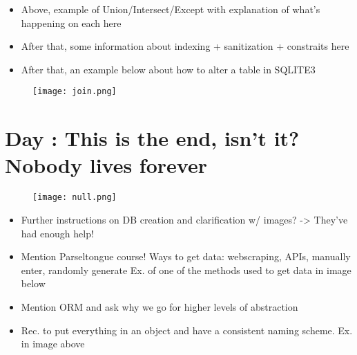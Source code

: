 \documentclass{42-en}
\begin{document}
	\begin{itemize}\itemsep1pt 
		\item Above, example of Union/Intersect/Except with explanation of what's happening on each here 
		\item After that, some information about indexing + sanitization + constraits here 
		\item After that, an example below about how to alter a table in SQLITE3
	\end{itemize}

            \begin{figure}[H]
                \begin{center}
                    \texttt{[image: join.png]}
                \end{center}
            \end{figure}

\nextexercice


\chapter{Day \exercicenumber: This is the end, isn't it? Nobody lives forever }
\makeheaderfiles

            \begin{figure}[H]
                \begin{center}
                    \texttt{[image: null.png]}
                \end{center}
            \end{figure}

	\begin{itemize}\itemsep1pt
		\item	Further instructions on DB creation and clarification w/ images? -> They've had enough help!  
		\item	Mention Parseltongue course! Ways to get data: webscraping, APIs, manually enter, randomly generate
			Ex. of one of the methods used to get data in image below
		\item	Mention ORM and ask why we go for higher levels of abstraction 
		\item	Rec. to put everything in an object and have a consistent naming scheme. Ex. in image above
	\end{itemize}
\end{document}

